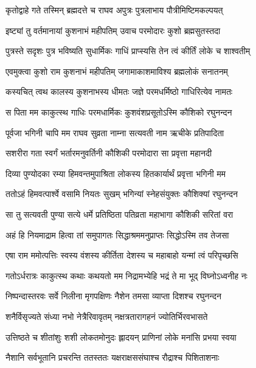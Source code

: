
\twolineshloka
{कृतोद्वाहे गते तस्मिन् ब्रह्मदत्ते च राघव}
{अपुत्रः पुत्रलाभाय पौत्रीमिष्टिमकल्पयत्} %

\twolineshloka
{इष्ट्यां तु वर्तमानायां कुशनाभं महीपतिम्}
{उवाच परमोदारः कुशो ब्रह्मसुतस्तदा} %

\twolineshloka
{पुत्रस्ते सदृशः पुत्र भविष्यति सुधार्मिकः}
{गाधिं प्राप्स्यसि तेन त्वं कीर्तिं लोके च शाश्वतीम्} %

\twolineshloka
{एवमुक्त्वा कुशो राम कुशनाभं महीपतिम्}
{जगामाकाशमाविश्य ब्रह्मलोकं सनातनम्} %

\twolineshloka
{कस्यचित् त्वथ कालस्य कुशनाभस्य धीमतः}
{जज्ञे परमधर्मिष्ठो गाधिरित्येव नामतः} %

\twolineshloka
{स पिता मम काकुत्स्थ गाधिः परमधार्मिकः}
{कुशवंशप्रसूतोऽस्मि कौशिको रघुनन्दन} %

\twolineshloka
{पूर्वजा भगिनी चापि मम राघव सुव्रता}
{नाम्ना सत्यवती नाम ऋचीके प्रतिपादिता} %

\twolineshloka
{सशरीरा गता स्वर्गं भर्तारमनुवर्तिनी}
{कौशिकी परमोदारा सा प्रवृत्ता महानदी} %

\twolineshloka
{दिव्या पुण्योदका रम्या हिमवन्तमुपाश्रिता}
{लोकस्य हितकार्यार्थं प्रवृत्ता भगिनी मम} %

\twolineshloka
{ततोऽहं हिमवत्पार्श्वे वसामि नियतः सुखम्}
{भगिन्यां स्नेहसंयुक्तः कौशिक्यां रघुनन्दन} %

\twolineshloka
{सा तु सत्यवती पुण्या सत्ये धर्मे प्रतिष्ठिता}
{पतिव्रता महाभागा कौशिकी सरितां वरा} %

\twolineshloka
{अहं हि नियमाद्राम हित्वा तां समुपागतः}
{सिद्धाश्रममनुप्राप्तः सिद्धोऽस्मि तव तेजसा} %

\twolineshloka
{एषा राम ममोत्पत्तिः स्वस्य वंशस्य कीर्तिता}
{देशस्य च महाबाहो यन्मां त्वं परिपृच्छसि} %

\twolineshloka
{गतोऽर्धरात्रः काकुत्स्थ कथाः कथयतो मम}
{निद्रामभ्येहि भद्रं ते मा भूद् विघ्नोऽध्वनीह नः} %

\twolineshloka
{निष्पन्दास्तरवः सर्वे निलीना मृगपक्षिणः}
{नैशेन तमसा व्याप्ता दिशश्च रघुनन्दन} %

\twolineshloka
{शनैर्विसृज्यते संध्या नभो नेत्रैरिवावृतम्}
{नक्षत्रतारागहनं ज्योतिर्भिरवभासते} %

\twolineshloka
{उत्तिष्ठते च शीतांशुः शशी लोकतमोनुदः}
{ह्लादयन् प्राणिनां लोके मनांसि प्रभया स्वया} %

\twolineshloka
{नैशानि सर्वभूतानि प्रचरन्ति ततस्ततः}
{यक्षराक्षससंघाश्च रौद्राश्च पिशिताशनाः} %

